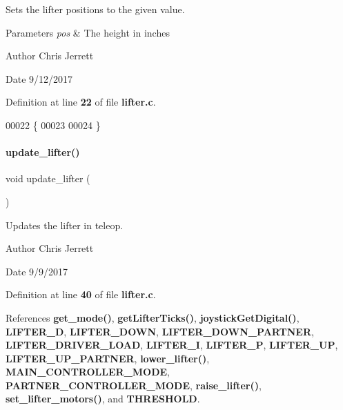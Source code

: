 Sets the lifter positions to the given value. 


\begin{DoxyParams}{Parameters}
{\em pos} & The height in inches \\
\hline
\end{DoxyParams}
\begin{DoxyAuthor}{Author}
Chris Jerrett 
\end{DoxyAuthor}
\begin{DoxyDate}{Date}
9/12/2017 
\end{DoxyDate}


Definition at line \textbf{ 22} of file \textbf{ lifter.\+c}.


\begin{DoxyCode}
00022                              \{
00023 
00024 \}
\end{DoxyCode}
\mbox{\label{lifter_8c_a59bb7413777ca16aba124aaedf95c79b}} 
\paragraph{update\+\_\+lifter()}
{\footnotesize\ttfamily void update\+\_\+lifter (\begin{DoxyParamCaption}{ }\end{DoxyParamCaption})}



Updates the lifter in teleop. 

\begin{DoxyAuthor}{Author}
Chris Jerrett 
\end{DoxyAuthor}
\begin{DoxyDate}{Date}
9/9/2017 
\end{DoxyDate}


Definition at line \textbf{ 40} of file \textbf{ lifter.\+c}.



References \textbf{ get\+\_\+mode()}, \textbf{ get\+Lifter\+Ticks()}, \textbf{ joystick\+Get\+Digital()}, \textbf{ L\+I\+F\+T\+E\+R\+\_\+D}, \textbf{ L\+I\+F\+T\+E\+R\+\_\+\+D\+O\+WN}, \textbf{ L\+I\+F\+T\+E\+R\+\_\+\+D\+O\+W\+N\+\_\+\+P\+A\+R\+T\+N\+ER}, \textbf{ L\+I\+F\+T\+E\+R\+\_\+\+D\+R\+I\+V\+E\+R\+\_\+\+L\+O\+AD}, \textbf{ L\+I\+F\+T\+E\+R\+\_\+I}, \textbf{ L\+I\+F\+T\+E\+R\+\_\+P}, \textbf{ L\+I\+F\+T\+E\+R\+\_\+\+UP}, \textbf{ L\+I\+F\+T\+E\+R\+\_\+\+U\+P\+\_\+\+P\+A\+R\+T\+N\+ER}, \textbf{ lower\+\_\+lifter()}, \textbf{ M\+A\+I\+N\+\_\+\+C\+O\+N\+T\+R\+O\+L\+L\+E\+R\+\_\+\+M\+O\+DE}, \textbf{ P\+A\+R\+T\+N\+E\+R\+\_\+\+C\+O\+N\+T\+R\+O\+L\+L\+E\+R\+\_\+\+M\+O\+DE}, \textbf{ raise\+\_\+lifter()}, \textbf{ set\+\_\+lifter\+\_\+motors()}, and \textbf{ T\+H\+R\+E\+S\+H\+O\+LD}.



